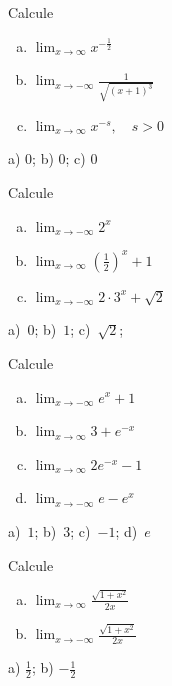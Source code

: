 \begin{exer}
  Calcule
  \begin{enumerate}[a)]
  \item $\displaystyle\lim_{x\to\infty} x^{-\frac{1}{2}}$ 
  \item $\displaystyle\lim_{x\to -\infty} \frac{1}{\sqrt{(x+1)^3}}$ 
  \item $\displaystyle\lim_{x\to \infty} x^{-s},\quad s>0$ 
  \end{enumerate}
\end{exer}
\begin{resp}
  a) $0$; b) $0$; c) $0$
\end{resp}

\begin{exer}
  Calcule
  \begin{enumerate}[a)]
  \item $\displaystyle \lim_{x\to -\infty} 2^{x}$
  \item $\displaystyle \lim_{x\to \infty} \left(\frac{1}{2}\right)^x+1$
  \item $\displaystyle \lim_{x\to -\infty} 2\cdot 3^x + \sqrt{2}$
  \end{enumerate}
\end{exer}
\begin{resp}
  a)~$0$; b)~$1$; c)~$\sqrt{2}$;
\end{resp}

\begin{exer}
  Calcule
  \begin{enumerate}[a)]
  \item $\displaystyle \lim_{x\to -\infty} e^x+1$
  \item $\displaystyle \lim_{x\to \infty} 3 + e^{-x}$
  \item $\displaystyle \lim_{x\to \infty} 2e^{-x}-1$
  \item $\displaystyle \lim_{x\to -\infty} e-e^{x}$
  \end{enumerate}
\end{exer}
\begin{resp}
  a)~$1$; b)~$3$; c)~$-1$; d)~$e$
\end{resp}

\begin{exer}
  Calcule
  \begin{enumerate}[a)]
  \item $\displaystyle\lim_{x\to \infty} \frac{\sqrt{1+x^2}}{2x}$
  \item $\displaystyle\lim_{x\to -\infty} \frac{\sqrt{1+x^2}}{2x}$
\end{enumerate}
\end{exer}
\begin{resp}
  a) $\frac{1}{2}$; b) $-\frac{1}{2}$
\end{resp}

